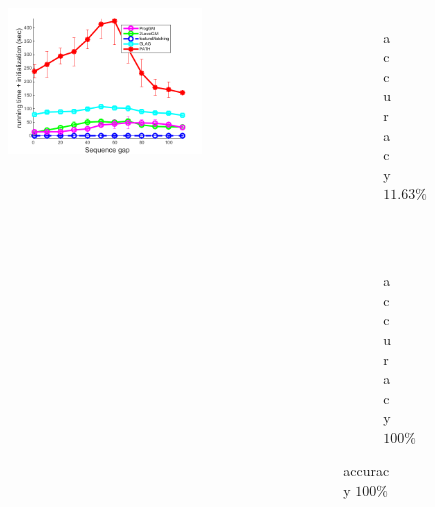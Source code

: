 \documentclass[hyperref={pdfpagelabels=false}]{beamer}
\begin{document}
\begin{frame}[allowframebreaks]
\begin{minipage}[0.2\textheight]{\textwidth}
\begin{columns}[T]
\begin{column}{0.7\textwidth}
\begin{figure}[h]
\begin{subfigure}[b]{0.32\textwidth}
						\includegraphics[scale=0.12]{"fig/evaluation/HouseSeq2/anchor_descr/using_cpd_afftrafo/ext_solution2/performance/time_summary"}
					\end{subfigure} 	
			\end{figure}

		\end{column}
		
		\begin{column}{0.3\textwidth}
			\begin{figure}[h!]
				\begin{subfigure}[b]{0.6\textwidth}
					\centering
					\includegraphics[width=2cm]{"fig/evaluation/HouseSeq2/anchor_descr/using_cpd_afftrafo/solution/fi_1_ProgGM"} 
					\caption{\tiny accuracy $11.63\%$}
				\end{subfigure}\\
				\begin{subfigure}[b]{0.6\textwidth}
					\centering
					\includegraphics[width=2cm]{"fig/evaluation/HouseSeq2/anchor_descr/using_cpd_afftrafo/ext_solution/fi_1_ProgGM"} 
					\caption{\tiny accuracy $100\%$}
				\end{subfigure}
			\end{figure}
		\end{column}
	\end{columns}
\end{minipage}
\end{frame}
\end{document}
